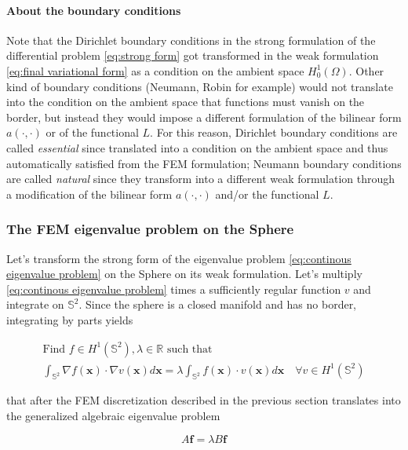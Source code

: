 \paragraph{About the boundary conditions}
	Note that the Dirichlet boundary conditions in the strong formulation of the differential problem \ref{eq:strong form} got transformed in the weak formulation \ref{eq:final variational form} as a condition on the ambient space $H_0^1(\Omega)$. Other kind of boundary conditions (Neumann, Robin for example) would not translate into the condition on the ambient space that functions must vanish on the border, but instead they would impose a different formulation of the bilinear form $a(\cdot, \cdot)$ or of the functional $L$. For this reason, Dirichlet boundary conditions are called \textit{essential} since translated into a condition on the ambient space and thus automatically satisfied from the FEM formulation; Neumann boundary conditions are called \textit{natural} since they transform into a different weak formulation through a modification of the bilinear form $a(\cdot, \cdot)$ and/or the functional $L$.



\subsubsection{The FEM eigenvalue problem on the Sphere}
Let's transform the strong form of the eigenvalue problem \ref{eq:continous eigenvalue problem} on the Sphere on its weak formulation. Let's multiply \ref{eq:continous eigenvalue problem} times a sufficiently regular function $v$ and integrate on $\mathbb S^2$. Since the sphere is a closed manifold and has no border, integrating by parts yields

\begin{align}\label{eq:weak eigenvalue problem}
\text{Find } f\in H^1(\mathbb S^2), \lambda\in\mathbb R\text{ such that }\\ 
\int_{\mathbb S^2} \nabla f(\mathbf x)\cdot\nabla v(\mathbf x) d\mathbf x = \lambda \int_{\mathbb S^2} f(\mathbf x)\cdot v(\mathbf x)d\mathbf x\quad \forall v\in H^1(\mathbb S^2)
\end{align}

that after the FEM discretization described in the previous section translates into the generalized algebraic eigenvalue problem

\begin{equation}\label{eq:algebraic generalized eigenvalue problem}
	A\mathbf f = \lambda B \mathbf f
\end{equation}

